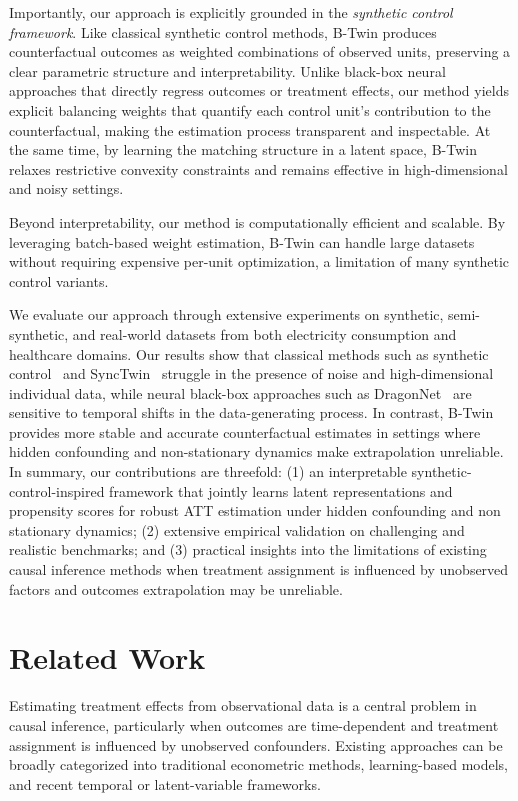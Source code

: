 \documentclass[10pt]{article} %
\begin{document}
Importantly, our approach is explicitly grounded in the \emph{synthetic control framework}. Like classical synthetic control methods, B-Twin produces counterfactual outcomes as weighted combinations of observed units, preserving a clear parametric structure and interpretability. Unlike black-box neural approaches that directly regress outcomes or treatment effects, our method yields explicit balancing weights that quantify each control unit’s contribution to the counterfactual, making the estimation process transparent and inspectable. At the same time, by learning the matching structure in a latent space, B-Twin relaxes restrictive convexity constraints and remains effective in high-dimensional and noisy settings.

Beyond interpretability, our method is computationally efficient and scalable. By leveraging batch-based weight estimation, B-Twin can handle large datasets without requiring expensive per-unit optimization, a limitation of many synthetic control variants.

We evaluate our approach through extensive experiments on synthetic, semi-synthetic, and real-world datasets from both electricity consumption and healthcare domains. Our results show that classical methods such as synthetic control~\citep{abadie2010synthetic} and SyncTwin~\citep{synctwin} struggle in the presence of noise and high-dimensional individual data, while neural black-box approaches such as DragonNet~\citep{dragonnet} are sensitive to temporal shifts in the data-generating process. {In contrast, B-Twin provides more stable and accurate counterfactual estimates in settings where hidden confounding and non-stationary dynamics make extrapolation unreliable.}
In summary, our contributions are threefold: (1) an interpretable synthetic-control-inspired framework that jointly learns latent representations and propensity scores for robust ATT estimation under hidden confounding {and non stationary dynamics}; (2) extensive empirical validation on challenging and realistic benchmarks; and (3) practical insights into the limitations of existing causal inference methods when treatment assignment is influenced by unobserved factors and {outcomes extrapolation may be unreliable}.

\section{Related Work}

Estimating treatment effects from observational data is a central problem in causal inference, particularly when outcomes are time-dependent and treatment assignment is influenced by unobserved confounders. Existing approaches can be broadly categorized into traditional econometric methods, learning-based models, and recent temporal or latent-variable frameworks.
\end{document}
